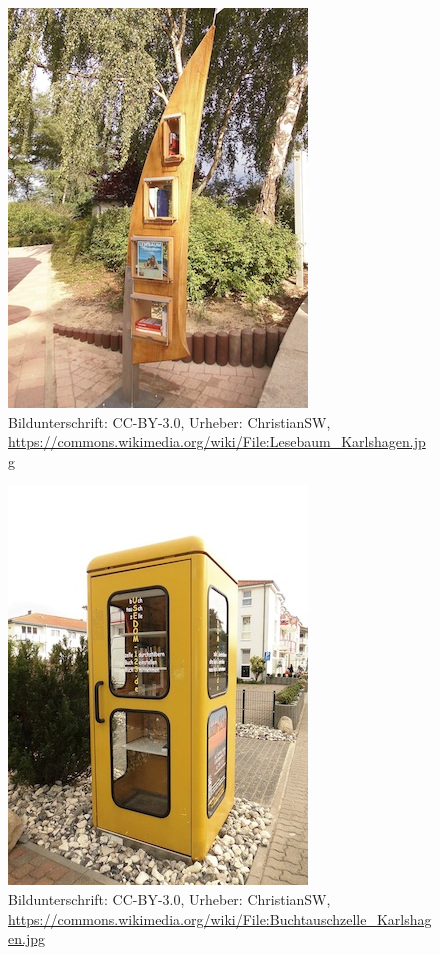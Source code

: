 \documentclass[a4paper,
fontsize=11pt,
oneside,
numbers=noperiodatend,
parskip=half-,
bibliography=totoc,
final
]{scrartcl}
\begin{document}
\begin{figure}[htbp]
\centering
\includegraphics{img/LesebaumKarlshagen.jpg}
\caption{Bildunterschrift: CC-BY-3.0, Urheber: ChristianSW,
\url{https://commons.wikimedia.org/wiki/File:Lesebaum_Karlshagen.jpg}}
\end{figure}

\begin{figure}[htbp]
\centering
\includegraphics{img/BuchtauschzelleKarlshagen.jpg}
\caption{Bildunterschrift: CC-BY-3.0, Urheber: ChristianSW,
\url{https://commons.wikimedia.org/wiki/File:Buchtauschzelle_Karlshagen.jpg}}
\end{figure}
\end{document}
